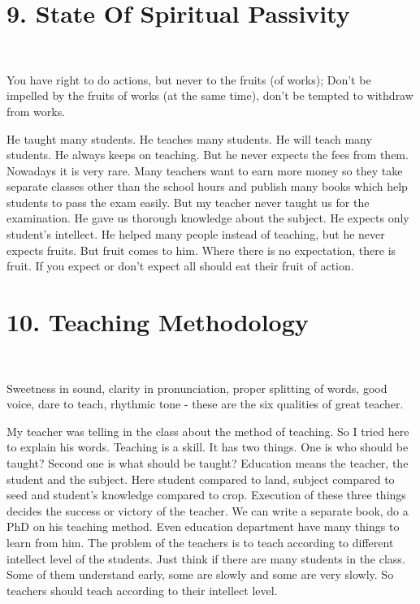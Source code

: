 \section*{9. State Of Spiritual Passivity }
\begin{center}
{\fontsize{15}{17}\selectfont
{}\\
}
\end{center}
You have right to do actions, but never to the fruits (of works); Don’t be impelled by the fruits of works (at the same time), don’t be tempted to withdraw from works.

He taught many students. He teaches many students. He will teach many students. He always keeps on teaching. But he never expects the fees from them. Nowadays it is very rare. Many teachers want to earn more money so they take separate classes other than the school hours and publish many books which help students to pass the exam easily. But my teacher never taught us for the examination. He gave us thorough knowledge about the subject. He expects only student’s intellect. He helped many people instead of teaching, but he never expects fruits. But fruit comes to him. Where there is no expectation, there is fruit. If you expect or don’t expect all should eat their fruit of action.

\section*{10. Teaching Methodology }
\begin{center}
{\fontsize{15}{17}\selectfont
{}\\
}
\end{center}
Sweetness in sound, clarity in pronunciation, proper splitting of words, good voice, dare to teach, rhythmic tone -  these are the six qualities of great teacher.

My teacher was telling in the class about the method of teaching. So I tried here to explain his words. Teaching is a skill. It has two things. One is who should be taught? Second one is what should be taught? Education means the teacher, the student and the subject. Here student compared to land, subject compared to seed and student’s knowledge compared to crop. Execution of these three things decides the success or victory of the teacher. We can write a separate book, do a PhD on his teaching method. Even education department have many things to learn from him. The problem of the teachers is to teach according to different intellect level of the students. Just think if there are many students in the class. Some of them understand early, some are slowly and some are very slowly. So teachers should teach according to their intellect level.

